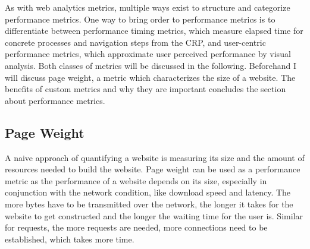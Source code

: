 
As with web analytics metrics, multiple ways exist to structure and categorize performance metrics.
One way to bring order to performance metrics is to differentiate between performance timing metrics, which measure elapsed time for concrete processes and navigation steps from the CRP, and user-centric performance metrics, which approximate user perceived performance by visual analysis.
Both classes of metrics will be discussed in the following.
Beforehand I will discuss page weight, a metric which characterizes the size of a website.
The benefits of custom metrics and why they are important concludes the section about performance metrics.














\subsection{Page Weight}

A naive approach of quantifying a website is measuring its size and the amount of resources needed to build the website.
Page weight can be used as a performance metric as the performance of a website depends on its size, especially in conjunction with the network condition, like download speed and latency.
The more bytes have to be transmitted over the network, the longer it takes for the website to get constructed and the longer the waiting time for the user is.
Similar for requests, the more requests are needed, more connections need to be established, which takes more time.

